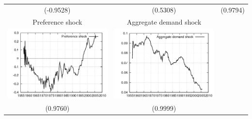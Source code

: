 \documentclass{beamer}
\begin{document}
{\begin{center}
\begin{tabular}{ccc}
  (-0.9528) & (0.5308) & (0.9794) \\ 
  \small{Preference shock} & \small{Aggregate demand shock} & \\
  \includegraphics[scale=0.23]{plots2/cap_diff_lnest_prefsh.png} & \includegraphics[scale=0.23]{plots2/cap_diff_lnest_ADsh.png} & \\
  (0.9760) & (0.9999) &  \\ 

  \end{tabular}
  \end{center}
}
\end{document}
